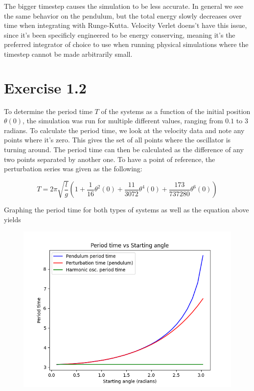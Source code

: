 \documentclass[a4paper,12pt]{article}
\begin{document}
The bigger timestep causes the simulation to be less accurate. In general we see the same behavior on the
pendulum, but the total energy slowly decreases over time when integrating with Runge-Kutta. Velocity Verlet
doens't have this issue, since it's been specificly engineered to be energy conserving, meaning it's the preferred
integrator of choice to use when running physical simulations where the timestep cannot be made arbitrarily small.


\section*{Exercise 1.2}

To determine the period time $T$ of the systems as a function of the initial position $\theta(0)$,
the simulation was run for multiple different values, ranging from $0.1$ to $3$ radians.
To calculate the period time, we look at the velocity data and note any points where it's zero. This gives 
the set of all points where the oscillator is turning around. The period time can then be calculated as the
difference of any two points separated by another one. To have a point of reference, the perturbation series
was given as the following:

\begin{equation}
  T = 2 \pi \sqrt{\frac{l}{g}} \left(1 + \frac{1}{16} \theta^2(0) + \frac{11}{3072} \theta^4(0) + \frac{173}{737280} \theta^6(0) \right)
\end{equation}

Graphing the period time for both types of systems as well as the equation above yields
\begin{figure}[!ht]
  \centering
  \includegraphics[scale=0.6]{img/2-period-time.png}
\end{figure}
\end{document}
